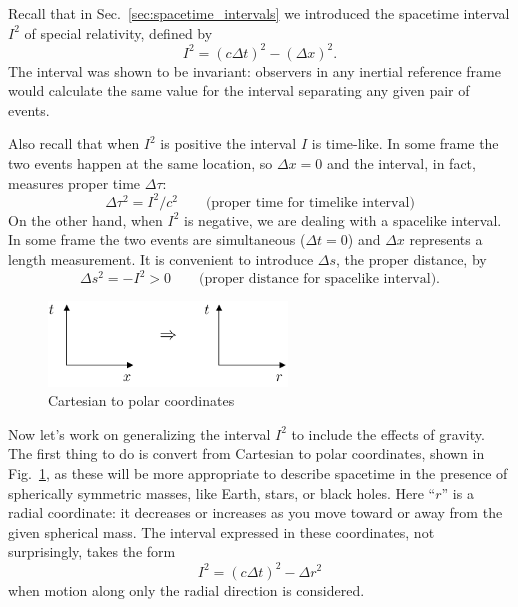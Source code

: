 Recall that in Sec.~\ref{sec:spacetime_intervals} we introduced the
spacetime interval $I^2$ of special relativity, defined by
\begin{equation}
I^2 = (c\Delta t)^2 - (\Delta x)^2.
\end{equation}     
The interval was shown to be invariant: observers in any inertial
reference frame would calculate the same value for the interval
separating any given pair of events.  


Also recall that when $I^2$ is
positive the interval $I$ is time-like. In some frame the two events
happen at the same location, so $\Delta x=0$
and the interval, in fact, measures proper time $\Delta\tau$:
\begin{equation} 
   \Delta\tau^2  = I^2/c^2 \qquad\text{(proper time for timelike interval)}
   \label{eq:proper_time}
\end{equation}
On the other hand, when $I^2$ is negative, we are dealing with a
spacelike interval.  In some frame the two events are simultaneous
($\Delta t=0$) and $\Delta x$ represents a length measurement.  It is
convenient to introduce $\Delta s$, the proper distance, by
\begin{equation}
 \Delta s^2 = -I^2 > 0 \qquad\text{(proper distance for spacelike interval)}.
 \label{eq:proper_distance}
\end{equation}


\begin{figure}[tbp]
\begin{center}
\includegraphics[width=2.5in]{gravity_and_geometry/coordinates.pdf}
\end{center}
\caption{Cartesian to polar coordinates}
\label{fig:cartesian_to_spherical}
\end{figure}

Now let's work on generalizing the interval $I^2$ to include the effects of
gravity.  The first thing to do is convert from Cartesian to polar
coordinates, shown in Fig.~\ref{fig:cartesian_to_spherical}, as
these will be more appropriate to describe spacetime in the presence
of spherically symmetric masses, like Earth, stars, or black holes.
Here ``$r$'' is a radial coordinate: it decreases or increases as you
move toward or away from the given spherical mass.  The interval
expressed in these coordinates, not surprisingly, takes the form
\begin{equation}
I^2 =  (c\Delta t)^2 - \Delta r^2
\label{eq:flat_space_spherical}
\end{equation}
when motion along only the radial direction is considered.

